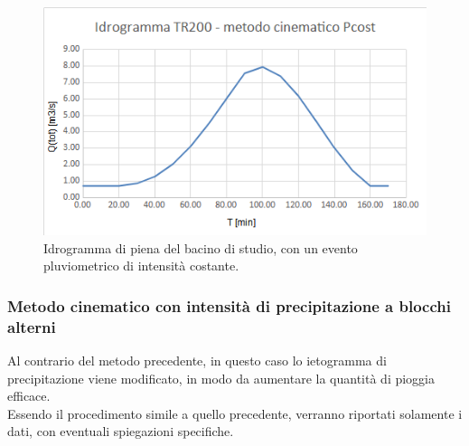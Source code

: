 \begin{figure}[H]  \centering
            \includegraphics[scale=0.8]{immagini/metodo_cinematico_p_cost.png}
            \caption{Idrogramma di piena del bacino di studio, con un evento pluviometrico di intensità costante.}
            \label{metodo_cinematico_p_cost}
\end{figure}

\subsubsection{Metodo cinematico con intensità di precipitazione a blocchi alterni}
Al contrario del metodo precedente, in questo caso lo ietogramma di precipitazione viene modificato, in modo da aumentare la quantità di pioggia efficace.\\
Essendo il procedimento simile a quello precedente, verranno riportati solamente i dati, con eventuali spiegazioni specifiche.

